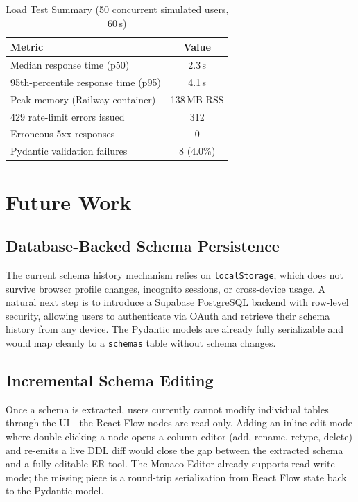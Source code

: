 \documentclass[conference]{IEEEtran}
\begin{document}
\begin{table}[htbp]
\caption{Load Test Summary (50 concurrent simulated users, 60\,s)}
\label{tab:load}
\centering
\begin{tabular}{@{}lc@{}}
\toprule
Metric & Value \\
\midrule
Median response time (p50) & 2.3\,s \\
95th-percentile response time (p95) & 4.1\,s \\
Peak memory (Railway container) & 138\,MB RSS \\
429 rate-limit errors issued & 312 \\
Erroneous 5xx responses & 0 \\
Pydantic validation failures & 8 (4.0\%) \\
\bottomrule
\end{tabular}
\end{table}

\section{Future Work}

\subsection{Database-Backed Schema Persistence}

The current schema history mechanism relies on \texttt{localStorage},
which does not survive browser profile changes, incognito sessions,
or cross-device usage. A natural next step is to introduce a
Supabase PostgreSQL backend with row-level security, allowing users
to authenticate via OAuth and retrieve their schema history from
any device. The Pydantic models are already fully serializable
and would map cleanly to a \texttt{schemas} table without schema
changes.

\subsection{Incremental Schema Editing}

Once a schema is extracted, users currently cannot modify individual
tables through the UI---the React Flow nodes are read-only. Adding
an inline edit mode where double-clicking a node opens a column
editor (add, rename, retype, delete) and re-emits a live DDL
diff would close the gap between the extracted schema and a fully
editable ER tool. The Monaco Editor already supports read-write mode;
the missing piece is a round-trip serialization from React Flow
state back to the Pydantic model.
\end{document}
